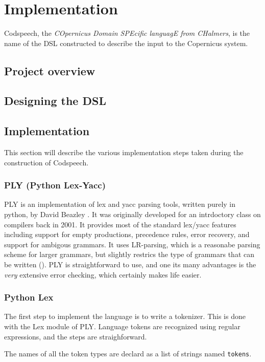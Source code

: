 \chapter{Implementation}
Codspeech, the \emph{COpernicus Domain SPEcific languagE from
  CHalmers}, is the name of the DSL constructed to describe the input
to the Copernicus system.


\section{Project overview}


\section{Designing the DSL}


\section{Implementation}
This section will describe the various implementation steps taken
during the construction of Codspeech.


\subsection{PLY (Python Lex-Yacc)}\label{sec:ply}
PLY is an implementation of lex and yacc parsing tools, written purely
in python, by David Beazley \citep{ply:online}. It was originally
developed for an intrdoctory class on compilers back in 2001. It
provides most of the standard lex/yacc features including support for
empty productions, precedence rules, error recovery, and support for
ambigous grammars. It uses LR-parsing, which is a reasonabe parsing
scheme for larger grammars, but slightly restrics the type of grammars
that can be written (). PLY is
straightforward to use, and one its many advantages is the \emph{very}
extensive error checking, which certainly makes life easier.

\subsection{Python Lex}
The first step to implement the language is to write a tokenizer. This
is done with the Lex module of PLY. Language tokens are recognized
using regular expressions, and the steps are straighforward.

The names of all the token types are declard as a list of strings
named \texttt{tokens}.

